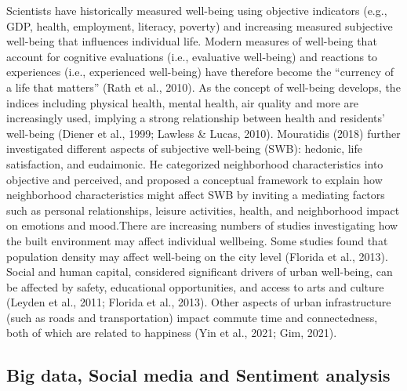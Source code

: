 \documentclass[
]{article}
\begin{document}
Scientists have historically measured well-being using objective
indicators (e.g., GDP, health, employment, literacy, poverty) and
increasing measured subjective well-being that influences individual
life. Modern measures of well-being that account for cognitive
evaluations (i.e., evaluative well-being) and reactions to experiences
(i.e., experienced well-being) have therefore become the ``currency of a
life that matters'' (Rath et al., 2010). As the concept of well-being
develops, the indices including physical health, mental health, air
quality and more are increasingly used, implying a strong relationship
between health and residents' well-being (Diener et al., 1999; Lawless
\& Lucas, 2010). Mouratidis (2018) further investigated different
aspects of subjective well-being (SWB): hedonic, life satisfaction, and
eudaimonic. He categorized neighborhood characteristics into objective
and perceived, and proposed a conceptual framework to explain how
neighborhood characteristics might affect SWB by inviting a mediating
factors such as personal relationships, leisure activities, health, and
neighborhood impact on emotions and mood.There are increasing numbers of
studies investigating how the built environment may affect individual
wellbeing. Some studies found that population density may affect
well-being on the city level (Florida et al., 2013). Social and human
capital, considered significant drivers of urban well-being, can be
affected by safety, educational opportunities, and access to arts and
culture (Leyden et al., 2011; Florida et al., 2013). Other aspects of
urban infrastructure (such as roads and transportation) impact commute
time and connectedness, both of which are related to happiness (Yin et
al., 2021; Gim, 2021).

\hypertarget{big-data-social-media-and-sentiment-analysis}{%
\subsection{Big data, Social media and Sentiment
analysis}\label{big-data-social-media-and-sentiment-analysis}}
\end{document}

